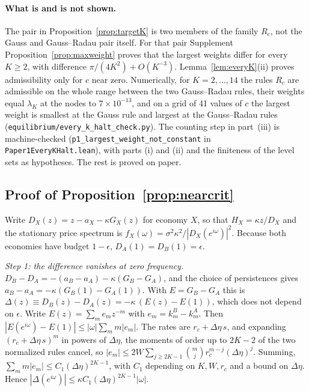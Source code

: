 \documentclass[12pt]{article}
\theoremstyle{definition}
\theoremstyle{remark}
\begin{document}
\paragraph{What is and is not shown.} The pair in Proposition~\ref{prop:targetK} is two members of the family $R_c$, not the Gauss and Gauss--Radau pair itself. For that pair Supplement Proposition~\ref{prop:maxweight} proves that the largest weights differ for every $K\ge2$, with difference $\pi/(4K^2)+O(K^{-3})$. Lemma~\ref{lem:everyK}(ii) proves admissibility only for $c$ near zero. Numerically, for $K=2,\ldots,14$ the rules $R_c$ are admissible on the whole range between the two Gauss--Radau rules, their weights equal $\lambda_K$ at the nodes to $7\times10^{-13}$, and on a grid of 41 values of $c$ the largest weight is smallest at the Gauss rule and largest at the Gauss--Radau rules (\nolinkurl{equilibrium/every_k_halt_check.py}). The counting step in part~(iii) is machine-checked (\texttt{p1\_largest\_weight\_not\_constant} in \nolinkurl{Paper1EveryKHalt.lean}), with parts (i) and (ii) and the finiteness of the level sets as hypotheses. The rest is proved on paper.


\subsection{Proof of Proposition~\ref{prop:nearcrit}}\label{app:nearcrit}

Write $D_X(z)=z-a_X-\kappa G_X(z)$ for economy $X$, so that $H_X=\kappa z/D_X$ and the stationary price spectrum is $f_X(\omega)=\sigma^2\kappa^2/|D_X(e^{i\omega})|^2$. Because both economies have budget $1-\epsilon$, $D_A(1)=D_B(1)=\epsilon$.

\emph{Step 1: the difference vanishes at zero frequency.} $D_B-D_A=-(a_B-a_A)-\kappa(G_B-G_A)$, and the choice of persistences gives $a_B-a_A=-\kappa(G_B(1)-G_A(1))$. With $E=G_B-G_A$ this is $\Delta(z)\equiv D_B(z)-D_A(z)=-\kappa\,(E(z)-E(1))$, which does not depend on $\epsilon$. Write $E(z)=\sum_me_mz^{-m}$ with $e_m=k^B_m-k^A_m$. Then $|E(e^{i\omega})-E(1)|\le|\omega|\sum_mm|e_m|$. The rates are $r_c+\Delta\eta\,s$, and expanding $(r_c+\Delta\eta\,s)^m$ in powers of $\Delta\eta$, the moments of order up to $2K-2$ of the two normalized rules cancel, so $|e_m|\le2W\sum_{j\ge2K-1}\binom mj r_c^{m-j}(\Delta\eta)^j$. Summing, $\sum_mm|e_m|\le C_1(\Delta\eta)^{2K-1}$, with $C_1$ depending on $K,W,r_c$ and a bound on $\Delta\eta$. Hence $|\Delta(e^{i\omega})|\le\kappa C_1(\Delta\eta)^{2K-1}|\omega|$.
\end{document}
